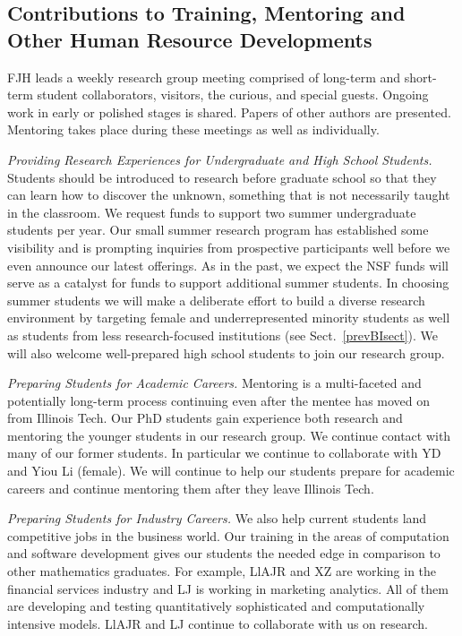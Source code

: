 \documentclass[11pt]{NSFamsart}
\begin{document}
\subsection{Contributions to Training, Mentoring and Other Human Resource Developments}
FJH leads a weekly research group meeting comprised of long-term and short-term student 
collaborators, visitors, the curious, and special guests.  Ongoing work in early or polished stages is shared.  Papers of other authors are presented.  Mentoring takes place during these meetings as well as individually.

\emph{Providing Research Experiences for Undergraduate and High School Students.} Students 
should be introduced to research before graduate school so that they can learn how to 
discover the unknown, something that is not necessarily taught in the classroom. We request funds 
to 
support two summer undergraduate students per year.  Our small summer research program has established some visibility 
and is prompting inquiries from prospective participants well before we 
even announce our latest 
offerings. As in the past, we expect the NSF funds will serve as a catalyst for funds to 
support additional summer students. In choosing summer students we will make a deliberate effort to 
build 
a diverse research environment by targeting female and underrepresented minority students as well 
as students from less research-focused institutions (see Sect.~\ref{prevBIsect}). We will also 
welcome well-prepared high school students to join our research group.

\emph{Preparing Students for Academic Careers.} Mentoring is a multi-faceted and 
potentially long-term process continuing even after the mentee has moved on from Illinois Tech.  
Our PhD students gain experience both research and mentoring the younger students in our 
research group.  We 
continue contact with many of our former students.  In particular we continue to 
collaborate with YD and Yiou Li (female).  We will continue to help our students prepare for 
academic careers and continue mentoring them after they leave Illinois Tech.

\emph{Preparing Students for Industry Careers.}
We also help current students land 
competitive jobs in the business world. Our training in the areas of computation and software 
development gives our students the needed edge in comparison to other mathematics 
graduates. For example, LlAJR and XZ are working in the financial services industry and  LJ is 
working in marketing analytics.  All of them are developing and testing quantitatively sophisticated 
and computationally intensive models.  LlAJR and LJ continue to collaborate with us on research.
\end{document}
